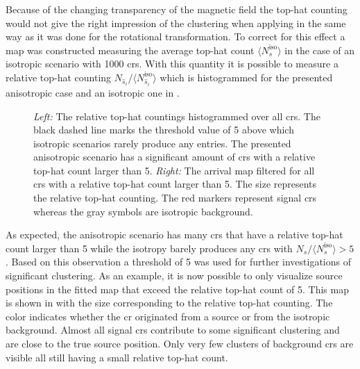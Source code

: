 Because of the changing transparency of the magnetic field the top-hat counting would not give the right impression of the clustering when applying in the same way as it was done for the rotational transformation. To correct for this effect a map was constructed measuring the average top-hat count \(\langle N_s^\text{iso} \rangle{}\) in the case of an isotropic scenario with 1000 \glspl{cr}. With this quantity it is possible to measure a relative top-hat counting \(N_{\hat s_i} / \langle N_{\hat s_i}^\text{iso}\rangle{}\) which is histogrammed for the presented anisotropic case and an isotropic one in .
\begin{figure}[ht!]
    \centering
    \begin{minipage}{0.49\textwidth}
    \end{minipage}
    \begin{minipage}{0.49\textwidth}
    \end{minipage}
    \caption{\emph{Left:} The relative top-hat countings histogrammed over all \glspl{cr}. The black dashed line marks the threshold value of 5 above which isotropic scenarios rarely produce any entries. The presented anisotropic scenario has a significant amount of \glspl{cr} with a relative top-hat count larger than 5. \emph{Right:} The arrival map filtered for all \glspl{cr} with a relative top-hat count larger than 5. The size represents the relative top-hat counting. The red markers represent signal \glspl{cr} whereas the gray symbols are isotropic background.}\label{fig:jf12-reltophat}
\end{figure}

As expected, the anisotropic scenario has many \glspl{cr} that have a relative top-hat count larger than 5 while the isotropy barely produces any \glspl{cr} with \(N_s / \langle N_s^\text{iso}\rangle > 5\). Based on this observation a threshold of 5 was used for further investigations of significant clustering. As an example, it is now possible to only visualize source positions in the fitted map that exceed the relative top-hat count of 5. This map is shown in  with the size corresponding to the relative top-hat counting. The color indicates whether the \gls{cr} originated from a source or from the isotropic background. Almost all signal \glspl{cr} contribute to some significant clustering and are close to the true source position. Only very few clusters of background \glspl{cr} are visible all still having a small relative top-hat count.

